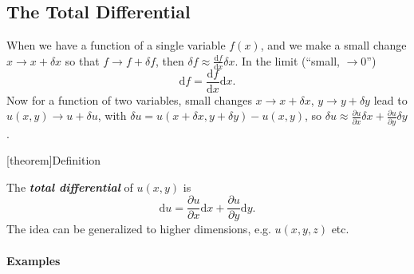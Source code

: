 \documentclass[12pt]{report}
\theoremstyle{definition}
\begin{document}
\subsection{The Total Differential}

When we have a function of a single variable $f(x)$,
and we make a small change $x \rightarrow{} x + \delta x$
so that $f \rightarrow{} f + \delta f$, then 
$\delta f \approx \frac{\mathrm{d}f}{\mathrm{d}x} \delta x$.
In the limit (``small, $\rightarrow{}0$'')\[
    \mathrm{d}f = \frac{\mathrm{d}f}{\mathrm{d}x} \mathrm{d}x.
\]
Now for a function of two variables, small changes $x \rightarrow{} x + \delta x$,
$y \rightarrow{} y + \delta y$ lead to $u(x,y) \rightarrow{} u + \delta u$,
with $\delta u = u(x+\delta x, y+\delta y) - u(x,y)$, so
$\delta u \approx \frac{\partial u}{\partial x} \delta x + \frac{\partial u}{\partial y} \delta y$.

[theorem]{Definition}
\begin{total differential}
    The \textbf{\emph{total differential}} of $u(x,y)$ is\[
    \mathrm{d}u = \frac{\partial u}{\partial x} \mathrm{d}x + \frac{\partial u}{\partial y} \mathrm{d}y.
\]
The idea can be generalized to higher dimensions, e.g. $u(x,y,z)$ etc.
\end{total differential}

\paragraph{Examples}
\,
\end{document}

